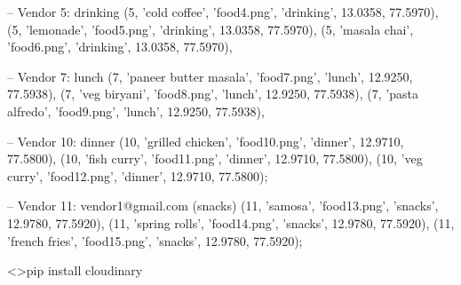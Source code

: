 -- Vendor 5: drinking
(5, 'cold coffee', 'food4.png', 'drinking', 13.0358, 77.5970),
(5, 'lemonade', 'food5.png', 'drinking', 13.0358, 77.5970),
(5, 'masala chai', 'food6.png', 'drinking', 13.0358, 77.5970),

-- Vendor 7: lunch
(7, 'paneer butter masala', 'food7.png', 'lunch', 12.9250, 77.5938),
(7, 'veg biryani', 'food8.png', 'lunch', 12.9250, 77.5938),
(7, 'pasta alfredo', 'food9.png', 'lunch', 12.9250, 77.5938),

-- Vendor 10: dinner
(10, 'grilled chicken', 'food10.png', 'dinner', 12.9710, 77.5800),
(10, 'fish curry', 'food11.png', 'dinner', 12.9710, 77.5800),
(10, 'veg curry', 'food12.png', 'dinner', 12.9710, 77.5800);

-- Vendor 11: vendor1@gmail.com (snacks)
(11, 'samosa', 'food13.png', 'snacks', 12.9780, 77.5920),
(11, 'spring rolls', 'food14.png', 'snacks', 12.9780, 77.5920),
(11, 'french fries', 'food15.png', 'snacks', 12.9780, 77.5920);



<>pip install cloudinary
